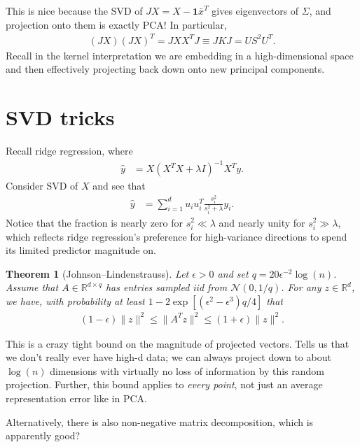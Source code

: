 \documentclass[11pt,letterpaper]{article}
\newcommand{\e}{\epsilon}
\newcommand{\R}{\mathbb{R}}
\theoremstyle{definition}
\theoremstyle{plain}
\newtheorem{thm}{Theorem}[section]
\numberwithin{equation}{section}
\numberwithin{figure}{section}
\begin{document}
This is nice because the SVD of $JX = X - \bm{1}\bar{x}^T$ gives eigenvectors of $\Sigma$, and projection onto them is exactly PCA! In particular,
%
\begin{align}
	(JX)(JX)^T = J XX^T J \equiv J K J = U S^2 U^T.
\end{align}
%
Recall in the kernel interpretation we are embedding in a high-dimensional space and then effectively projecting back down onto new principal components.






\section{SVD tricks}
Recall ridge regression, where
%
\begin{align}
	\hat{y} &= X (X^T X + \lambda I)^{-1} X^T y.
\end{align}
%
Consider SVD of $X$ and see that
%
\begin{align}
	\hat{y} &= \sum_{i=1}^d u_i u_i^T \frac{s_i^2}{s_i^2 + \lambda} y_i.
\end{align}
%
Notice that the fraction is nearly zero for $s_i^2 \ll \lambda$ and nearly unity for $s_i^2 \gg \lambda$, which reflects ridge regression's preference for high-variance directions to spend its limited predictor magnitude on.


\begin{thm}[Johnson--Lindenstrauss]
	Let $\e > 0$ and set $q = 20 \e^{-2} \log(n)$. Assume that $A \in \R^{d \times q}$ has entries sampled iid from $\mathcal{N}(0,1/q)$. For any $z \in \R^d$, we have, with probability at least $1 - 2 \exp\left[(\e^2-\e^3)q/4\right]$ that
	\begin{align}
		(1-\e)\|z\|^2 \leq \|A^T z\|^2 \leq (1+\e)\|z\|^2.
	\end{align}
\end{thm}

This is a crazy tight bound on the magnitude of projected vectors. Tells us that we don't really ever have high-d data; we can always project down to about $\log(n)$ dimensions with virtually no loss of information by this random projection. Further, this bound applies to \emph{every point}, not just an average representation error like in PCA.

Alternatively, there is also non-negative matrix decomposition, which is apparently good?
\end{document}
